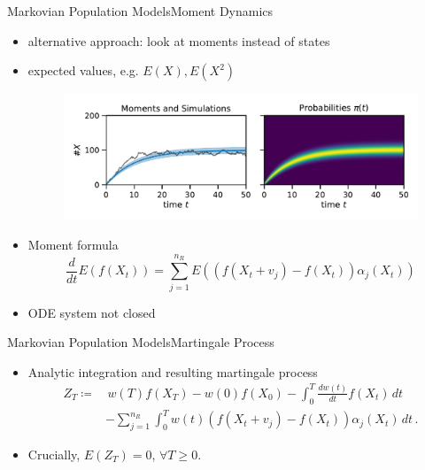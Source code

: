 \documentclass{beamer}
\newcommand{\expSym}{{E}}
\newcommand{\E}[1]{\ensuremath{\expSym\left(#1\right)}}
\renewcommand{\vec}[1]{\ensuremath{#1}}
\begin{document}
\begin{frame}{Markovian Population Models}{Moment Dynamics}
  \begin{itemize}
    \item alternative approach: look at moments instead of states
    \item expected values, e.g. $\E{X}, \E{X^2}$
    \begin{figure}
        \centering
    \includegraphics[scale=.4]{../gfx/momsandprobs.pdf}
    \end{figure}
    \item Moment formula
        \begin{equation*}
            \frac{d}{dt}\E{f({\vec{ X}}_t)} = \sum_{j=1}^{n_R}\E{\left(f({\vec X_t +
            \vec{v}_j}) - f(\vec X_t)\right)\alpha_j(\vec X_t)}
        \end{equation*}
    \item ODE system not closed
  \end{itemize}
\end{frame}

\begin{frame}{Markovian Population Models}{Martingale Process}
    \begin{itemize}
    \item Analytic integration and resulting martingale process
        \begin{equation*}
            \begin{split}
            Z_T\coloneqq&\,w(T)f(\vec X_T) - w(0)f(\vec X_{0}) -
            \int_{0}^T\frac{dw(t)}{dt}f(\vec X_t)\,dt\\
            &-\sum_{j=1}^{n_R}\int_{0}^Tw(t)
                 (f(\vec X_t+\vec v_j) - f(\vec X_t))\alpha_j(\vec X_t)\,dt\,.
         \end{split}
        \end{equation*}
    \item Crucially, $\E{Z_T}=0$, $\forall T\geq 0$.
  \end{itemize}
\end{frame}
\end{document}
